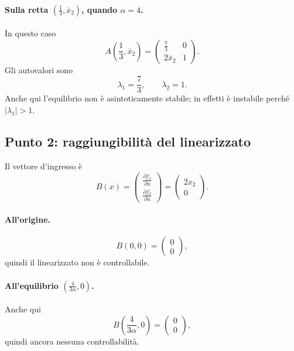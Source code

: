 \paragraph{Sulla retta \(\left(\frac13,\bar x_2\right)\), quando \(\alpha=4\).}
In questo caso
\[
A\!\left(\frac13,\bar x_2\right)=
\begin{pmatrix}
\frac73 & 0\\[6pt]
2\bar x_2 & 1
\end{pmatrix}.
\]
Gli autovalori sono
\[
\lambda_1=\frac73,
\qquad
\lambda_2=1.
\]
Anche qui l'equilibrio non \`e asintoticamente stabile; in effetti \`e instabile perch\'e \(|\lambda_1|>1\).

\subsection{Punto 2: raggiungibilit\`a del linearizzato}

Il vettore d'ingresso \`e
\[
B(x)=
\begin{pmatrix}
\frac{\partial f_1}{\partial u}\\[4pt]
\frac{\partial f_2}{\partial u}
\end{pmatrix}
=
\begin{pmatrix}
2x_2\\
0
\end{pmatrix}.
\]

\paragraph{All'origine.}
\[
B(0,0)=
\begin{pmatrix}
0\\
0
\end{pmatrix},
\]
quindi il linearizzato non \`e controllabile.

\paragraph{All'equilibrio \(\left(\frac{4}{3\alpha},0\right)\).}
Anche qui
\[
B\!\left(\frac{4}{3\alpha},0\right)=
\begin{pmatrix}
0\\
0
\end{pmatrix},
\]
quindi ancora nessuna controllabilit\`a.

